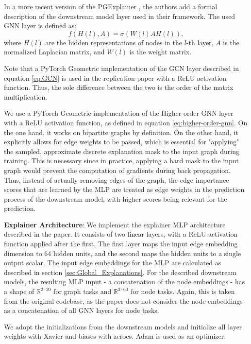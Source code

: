 In a more recent version of the PGExplainer \cite{10423141}, the authors add a formal description of the downstream model layer used in their framework. The used GNN layer is defined as:
\begin{equation}
    f(H(l),A)=\sigma(W(l)AH(l)),
\end{equation}
where $H(l)$ are the hidden representations of nodes in the $l$-th layer, $A$ is the normalized Laplacian matrix, and $W(l)$ is the weight matrix.

Note that a PyTorch Geometric implementation of the GCN layer described in equation \ref{eq:GCN} is used in the replication paper \cite{holdijk2021re} with a ReLU activation function. Thus, the sole difference between the two is the order of the matrix multiplication. \bigskip

We use a PyTorch Geometric implementation of the Higher-order GNN layer with a ReLU activation function, as defined in equation \ref{eq:higher-order-gnn}. On the one hand, it works on bipartite graphs by definition. On the other hand, it explicitly allows for edge weights to be passed, which is essential for "applying" the sampled, approximate discrete explanation mask to the input graph during training. This is necessary since in practice, applying a hard mask to the input graph would prevent the computation of gradients during back propagation. Thus, instead of actually removing edges of the graph, the edge importance scores that are learned by the MLP are treated as edge weights in the prediction process of the downstream model, with higher scores being relevant for the prediction. \bigskip

\textbf{Explainer Architecture}:
We implement the explainer MLP architecture described in the paper. It consists of two linear layers, with a ReLU activation function applied after the first. The first layer maps the input edge embedding dimension to 64 hidden units, and the second maps the hidden units to a single output scalar. The input edge embeddings for the MLP are calculated as described in section \ref{sec:Global_Explanations}. For the described downstream models, the resulting MLP input - a concatenation of the node embeddings - has a shape of $\mathbb{R}^{2\cdot20}$ for graph tasks and $\mathbb{R}^{3\cdot60}$ for node tasks. Again, this is taken from the original codebase, as the paper does not consider the node embeddings as a concatenation of all GNN layers for node tasks.

We adopt the initializations from the downstream models and initialize all layer weights with Xavier \cite{} and biases with zeroes. Adam \cite{kingma2014adam} is used as an optimizer.

